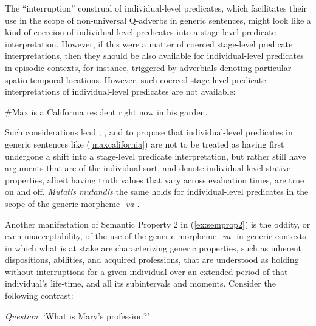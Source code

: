 \documentclass[output=paper,colorlinks,citecolor=brown]{langscibook}
\begin{document}
\noindent The ``interruption'' construal of individual-level predicates,  which facilitates
their use in the scope of non-universal Q-adverbs in generic sentences,
might look like a kind of coercion of individual-level predicates into a stage-level predicate interpretation.
However, if this were a matter of coerced stage-level predicate interpretations,
then they should be also available for individual-level predicates in episodic contexts,
for instance, triggered by adverbials denoting particular spatio-temporal locations. However, such coerced stage-level predicate interpretations of individual-level predicates are not available:

\ea\#Max is a California resident right now in his garden.
\z

\noindent Such considerations lead \citet{carlson1977unified}, \citet{kratzer1989stage}, and \citet{fernald2000} to propose that individual-level predicates in generic sentences like (\ref{maxcalifornia})
are not to be treated as having first undergone a shift into a stage-level predicate interpretation, but rather still have arguments that are of the individual sort, and denote individual-level stative properties,
albeit having truth values that vary across evaluation times, are true on and off.  \textit{Mutatis mutandis} the same holds for individual-level predicates in the scope of the
generic morpheme \textit{-va-}.

Another manifestation of Semantic Property 2 in (\ref{ex:semprop2})
is the oddity, or even unacceptability, of the use of
the  generic morpheme \textit{-va-}
in generic contexts in which what is at stake are
characterizing generic properties, such as
inherent dispositions, abilities, and acquired professions, that are understood as holding without interruptions for
a given individual over an extended period of that individual's life-time,
and all its subintervals and moments. Consider the following contrast:

\ea \textit{Question}:  %
`What is Mary's profession?'
\z
\z
\end{document}
